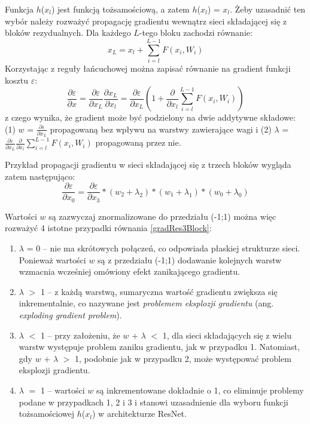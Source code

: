 Funkcja $h$($x_l$) jest funkcją tożsamościową, a zatem $h$($x_l$) = $x_l$. Żeby uzasadnić ten wybór należy rozważyć propagację gradientu wewnątrz sieci składającej się z bloków rezydualnych. Dla każdego $L$-tego bloku zachodzi równanie:
\begin{equation}
x_L = x_l + \sum_{i=l}^{L-1}F(x_i, W_i)
\end{equation}
Korzystając z reguły łańcuchowej można zapisać równanie na gradient funkcji kosztu $\varepsilon$:
\begin{equation}
\label{gradResBlock}
\frac{\partial \varepsilon}{\partial x} =  \frac{\partial \varepsilon}{\partial x_L} \frac{\partial x_L}{\partial x_l} =  \frac{\partial \varepsilon}{\partial x_L}\left (1 +   \frac{\partial }{\partial x_l}\sum_{i=l}^{L-1}F(x_i, W_i) \right )
\end{equation}
z czego wynika, że gradient może być podzielony na dwie addytywne składowe: (1) $w$ = $\frac{\partial \varepsilon}{\partial x_L}$ propagowaną bez wpływu na warstwy zawierające wagi i (2) $\lambda$ = $\frac{\partial \varepsilon}{\partial x_L}\frac{\partial }{\partial x_l}\sum_{i=l}^{L-1}F(x_i, W_i)$ propagowaną przez nie.

Przykład propagacji gradientu w sieci składającej się z trzech bloków wygląda zatem następująco:
\begin{equation}
\label{gradRes3Block}
\frac{\partial \varepsilon}{\partial x_0} =  \frac{\partial \varepsilon}{\partial x_3}*(w_2+\lambda_2)*(w_1+\lambda_1)*(w_0+\lambda_0)
\end{equation}

Wartości $w$ są zazwyczaj znormalizowane do przedziału (-1;1) można więc rozważyć 4 istotne przypadki równania \ref{gradRes3Block}:
\begin{enumerate}
	\item $\lambda$ = 0 -- nie ma skrótowych połączeń, co odpowiada płaskiej strukturze sieci. Ponieważ wartości $w$ są z przedziału (-1;1) dodawanie kolejnych warstw wzmacnia wcześniej omówiony efekt zanikającego gradientu.
	\item $\lambda$ $>$ 1 -- z każdą warstwą, sumaryczna wartość gradientu zwiększa się inkrementalnie, co nazywane jest \textit{problemem eksplozji gradientu} (ang. \textit{exploding gradient problem}).
	\item $\lambda$ $<$ 1 -- przy założeniu, że $w$ + $\lambda$ $<$ 1, dla sieci składających się z wielu warstw występuje problem zaniku gradientu, jak w przypadku 1. Natomiast, gdy $w$ + $\lambda$ $>$ 1, podobnie jak w przypadku 2, może występować problem eksplozji gradientu.
	\item $\lambda$ $=$ 1 -- wartości $w$ są inkrementowane dokładnie o 1, co eliminuje problemy podane w przypadkach 1, 2 i 3 i stanowi uzasadnienie dla wyboru funkcji tożsamościowej $h$($x_l$) w architekturze ResNet.
\end{enumerate}

